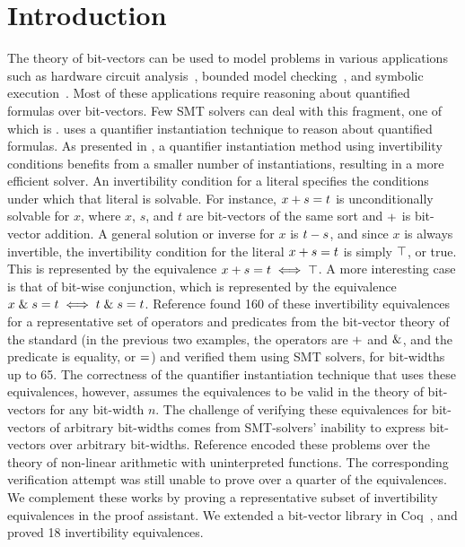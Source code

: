 \documentclass[10pt,conference]{IEEEtran}
\begin{document}
\section{Introduction}
\label{sec:intro}
The theory of bit-vectors can be used to model problems 
in various applications such as hardware 
circuit analysis~\cite{Gupta:1993:RSM:259794.259827}, 
bounded model checking~\cite{Armando2008BoundedMC}, and symbolic execution~\cite{Cadar:2006:EAG:1180405.1180445}. Most of 
these applications require reasoning about quantified 
formulas over bit-vectors. Few SMT solvers can deal 
with this fragment, one of which is \cvcfour. \cvcfour 
uses a quantifier 
instantiation technique to reason about quantified formulas. 
As presented in \cite{b1}, a quantifier instantiation 
method using invertibility conditions benefits from a smaller 
number of instantiations, resulting in a more efficient 
solver. An invertibility condition for a literal specifies 
the conditions under which that literal is solvable. For 
instance, $x + s = t$ is unconditionally solvable 
for $x$, where $x$, $s$, and $t$ are bit-vectors of the 
same sort and $+$ is bit-vector addition. 
A general solution or inverse for $x$ is $t - s$, and 
since $x$ is always invertible, the invertibility condition 
for the literal $x + s = t$ is 
simply $\top$, or true. This is represented by the equivalence 
$x + s = t \iff \top$. 
A more interesting case is that 
of bit-wise conjunction, which is represented by the 
equivalence 
$x \mathrel{\&} s = t \iff t \mathrel{\&} s = t$.
Reference \cite{b1} found 
160 of these invertibility equivalences for a 
representative set of operators and predicates from the 
bit-vector theory of the \smtlib standard 
(in the previous two examples, the operators are 
$+$ and $\mathrel{\&}$, 
and the predicate is equality, or $=$) and verified them 
using SMT solvers, for bit-widths up to 65. The correctness of the quantifier 
instantiation technique that uses these equivalences,
however, assumes the equivalences to be valid in the 
theory of bit-vectors for any bit-width $n$.
The challenge of verifying these equivalences for 
bit-vectors of arbitrary bit-widths comes from 
SMT-solvers' inability to express bit-vectors over
arbitrary bit-widths. Reference \cite{b2} encoded 
these problems over the theory of non-linear arithmetic 
with uninterpreted functions. The corresponding verification 
attempt was still unable to prove over a quarter of the 
equivalences. We complement these works by proving a 
representative subset of invertibility equivalences in 
the \coq proof assistant. We extended a bit-vector 
library in Coq~\cite{DBLP:conf/cav/EkiciMTKKRB17}, and proved 18 invertibility equivalences.
\end{document}
